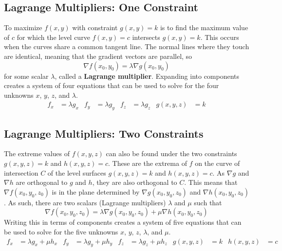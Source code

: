 \documentclass[../Calculus_\Roman{3}]{subfiles}
\begin{document}
		\subsection*{Lagrange Multipliers: One Constraint}
			To maximize $f(x, y)$ with constraint $g(x, y) = k$ is to find the maximum value of $c$ for which the level curve $f(x, y) = c$ intersects $g(x, y) = k$. This occurs when the curves share a common tangent line. The normal lines where they touch are identical, meaning that the gradient vectors are parallel, so
				\[\nabla f(x_0, y_0) = \lambda\nabla g(x_0, y_0)\]
				for some scalar $\lambda$, called a \textbf{Lagrange multiplier}.
			Expanding into components creates a system of four equations that can be used to solve for the four unknowns $x$, $y$, $z$, and $\lambda$.
			\begin{align*}
				f_x &= \lambda g_x &
					f_y &= \lambda g_y &
					f_z &= \lambda g_z &
					g(x, y, z) &= k
			\end{align*}
		\subsection*{Lagrange Multipliers: Two Constraints}
			The extreme values of $f(x, y, z)$ can also be found under the two constraints $g(x, y, z) = k$ and $h(x, y, z) = c$. These are the extrema of $f$ on the curve of intersection $C$ of the level surfaces $g(x, y, z) = k$ and $h(x, y, z) = c$. As $\nabla g$ and $\nabla h$ are orthogonal to $g$ and $h$, they are also orthogonal to $C$. This means that $\nabla f(x_0, y_0, z_0)$ is in the plane determined by $\nabla g(x_0, y_0, z_0)$ and $\nabla h(x_0, y_0, z_0)$. As such, there are two scalars (Lagrange multipliers) $\lambda$ and $\mu$ such that
			\[\nabla f(x_0, y_0, z_0) = \lambda\nabla g(x_0, y_0, z_0) + \mu\nabla h(x_0, y_0, z_0)\]
			Writing this in terms of components creates a system of five equations that can be used to solve for the five unknowns $x$, $y$, $z$, $\lambda$, and $\mu$.
			\begin{align*}
				f_x &= \lambda g_x + \mu h_x &
					f_y &= \lambda g_y + \mu h_y &
					f_z &= \lambda g_z + \mu h_z &
					g(x, y, z) &= k &
					h(x, y, z) &= c
			\end{align*}
\end{document}
